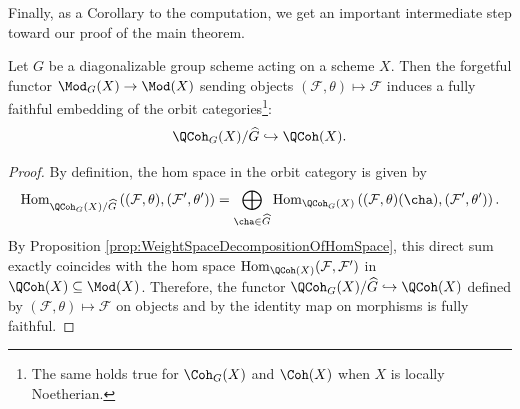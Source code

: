 Finally, as a Corollary to the computation, we get an important intermediate step toward our proof of the main theorem.
\begin{cor}
\label{thm:EmbeddingOfTheOrbitCategory}
Let $G$ be a diagonalizable group scheme acting on a scheme $X$.
Then the forgetful functor $\Mod_G(X) \rightarrow \Mod(X)$ sending objects $(\mathcal{F}, \theta) \mapsto \mathcal{F}$ induces a fully faithful embedding of the orbit categories\footnote{
The same holds true for $\Coh_G(X)$ and $\Coh(X)$ when $X$ is locally Noetherian.
}:
$$
\QCoh_G(X)/\widehat{G}
\hookrightarrow
\QCoh(X).
$$
\end{cor}

\begin{proof}
By definition, the hom space in the orbit category is given by
$$
\operatorname{Hom}_{\QCoh_G(X)/\widehat{G}}\left( (\mathcal{F}, \theta), (\mathcal{F}', \theta') \right)
=
\bigoplus_{\cha \in \widehat{G}} \operatorname{Hom}_{\QCoh_G(X)}\left( (\mathcal{F}, \theta)(\cha), (\mathcal{F}', \theta') \right).
$$
By Proposition \ref{prop:WeightSpaceDecompositionOfHomSpace}, this direct sum exactly coincides with the hom space $\operatorname{Hom}_{\QCoh(X)}(\mathcal{F}, \mathcal{F}')$ in $\QCoh(X)\subseteq\Mod(X)$.
Therefore, the functor $\QCoh_G(X)/\widehat{G} \hookrightarrow \QCoh(X)$ defined by $(\mathcal{F}, \theta) \mapsto \mathcal{F}$ on objects and by the identity map on morphisms is fully faithful.
\end{proof}



